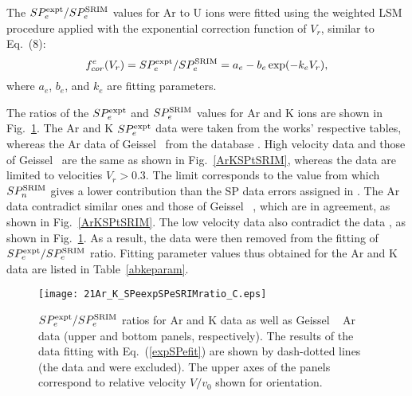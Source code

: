 \documentclass[aps,pra,twocolumn,amsmath,amssymb,floatfix]{revtex4-2}
\begin{document}
The $SP_{e}^{\rm expt}/SP_{e}^{\rm SRIM}$ values for Ar to U ions were fitted using the weighted LSM procedure applied with the exponential correction function of $V_{r}$, similar to Eq.~(8):
\begin{equation}  \label{expSPefit}
 f_{cor}^{e}(V_{r}) = SP_{e}^{\rm expt}/SP_{e}^{\rm SRIM} = a_{e} - b_{e}\exp(-k_{e} V_{r}),
\end{equation}
where $a_{e}$, $b_{e}$, and $k_{e}$ are fitting parameters.

The ratios of the $SP_{e}^{\rm expt}$ and $SP_{e}^{\rm SRIM}$ values for Ar and K ions are shown in Fig.~\ref{ArKSPeSRIM}. The Ar and K $SP_{e}^{\rm expt}$ data \cite{Fastrup66,Lennard86,Pape78,Trzaska18,SchulzBrandt82,Sharma99} were taken from the works' respective tables, whereas the Ar data of Geissel \ea\ from the database \cite{IAEASP}. High velocity data \cite{Pape78,Sharma99} and those of Geissel \ea\ are the same as shown in Fig.~\ref{ArKSPtSRIM}, whereas the data \cite{Trzaska18} are limited to velocities $V_{r} > 0.3$. The limit corresponds to the value from which $SP_{n}^{\rm SRIM}$ gives a lower contribution than the SP data errors assigned in \cite{Trzaska18}. The Ar data \cite{Pape78} contradict similar ones \cite{Trzaska18} and those of Geissel \ea\ \cite{IAEASP}, which are in agreement, as shown in Fig.~\ref{ArKSPtSRIM}. The low velocity data \cite{Lennard86} also contradict the data \cite{Fastrup66,SchulzBrandt82}, as shown in Fig.~\ref{ArKSPeSRIM}. As a result, the data \cite{Lennard86,Pape78} were then removed from the fitting of $SP_{e}^{\rm expt}/SP_{e}^{\rm SRIM}$ ratio. Fitting parameter values thus obtained for the Ar and K data are listed in Table~\ref{abkeparam}.

\begin{figure}[!h]   %
\begin{center}
\texttt{[image: 21Ar\_K\_SPeexpSPeSRIMratio\_C.eps]}
\caption{\label{ArKSPeSRIM}$SP_{e}^{\rm expt}/SP_{e}^{\rm SRIM}$ ratios for Ar and K data \cite{Fastrup66,Lennard86,Pape78,Trzaska18,SchulzBrandt82,Sharma99} as well as Geissel \ea\ \cite{IAEASP} Ar data (upper and bottom panels, respectively). The results of the data fitting with Eq.~(\ref{expSPefit}) are shown by dash-dotted lines (the data \cite{Lennard86} and  \cite{Pape78} were excluded). The upper axes of the panels correspond to relative velocity $V/v_{0}$ shown for orientation.}
\end{center}
\end{figure}
\end{document}
